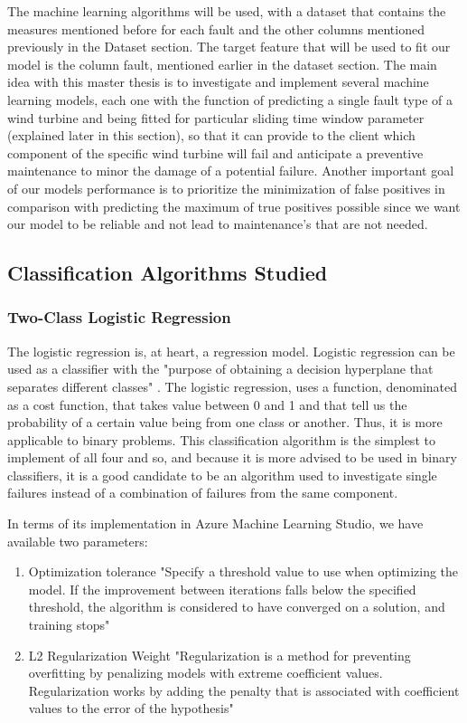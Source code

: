The machine learning algorithms will be used, with a dataset that contains the measures mentioned before for each fault and the other columns mentioned previously in the Dataset section. The target feature that will be used to fit our model is the column fault, mentioned earlier in the dataset section.
The main idea with this master thesis is to investigate and implement several machine learning models, each one with the function of predicting a single fault type of a wind turbine and being fitted for particular sliding time window parameter (explained later in this section), so that it can provide to the client which component of the specific wind turbine will fail and anticipate a preventive maintenance to minor the damage of a potential failure.
Another important goal of our models performance is to prioritize the minimization of false positives in comparison with predicting the maximum of true positives possible since we want our model to be reliable and not lead to maintenance's that are not needed.


\subsection{Classification Algorithms Studied} 
\label{sub:if_you_use_this_template} 

\subsubsection{Two-Class Logistic Regression}
The logistic regression is, at heart, a regression model. Logistic regression can be used as a classifier with the "purpose of obtaining a decision hyperplane that separates different classes" \cite{FCT_AA}.
The logistic regression, uses a function, denominated as a cost function, that takes value between 0 and 1 and that tell us the probability of a certain value being from one class or another. Thus, it is more applicable to binary problems.
This classification algorithm is the simplest to implement of all four and so, and because it is more advised to be used in binary classifiers, it is a good candidate to be an algorithm used to investigate single failures instead of a combination of failures from the same component.

In terms of its implementation in Azure Machine Learning Studio, we have available two parameters:
\begin{enumerate}
    \item{Optimization tolerance}
"Specify a threshold value to use when optimizing the model. If the improvement between iterations falls below the specified threshold, the algorithm is considered to have converged on a solution, and training stops" \cite{AZURE_MACHINE_LEARNING}
    \item{L2 Regularization Weight}
"Regularization is a method for preventing overfitting by penalizing models with extreme coefficient values. Regularization works by adding the penalty that is associated with coefficient values to the error of the hypothesis" \cite{AZURE_MACHINE_LEARNING}
\end{enumerate}



